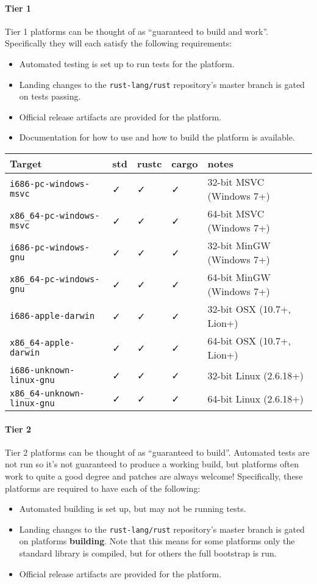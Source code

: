 \documentclass[a4paper,]{book}
\let\oldparagraph\paragraph
\renewcommand{\paragraph}[1]{\oldparagraph{#1}\mbox{}}
\begin{document}
\paragraph{Tier 1}\label{tier-1}

Tier 1 platforms can be thought of as ``guaranteed to build and work''.
Specifically they will each satisfy the following requirements:

\begin{itemize}
\itemsep1pt\parskip0pt
\item
  Automated testing is set up to run tests for the platform.
\item
  Landing changes to the \texttt{rust-lang/rust} repository's master
  branch is gated on tests passing.
\item
  Official release artifacts are provided for the platform.
\item
  Documentation for how to use and how to build the platform is
  available.
\end{itemize}

\begin{longtable}[c]{@{}lllll@{}}
\toprule
Target & std & rustc & cargo & notes\tabularnewline
\midrule
\endhead
\texttt{i686-pc-windows-msvc} & ✓ & ✓ & ✓ & 32-bit MSVC (Windows
7+)\tabularnewline
\texttt{x86\_64-pc-windows-msvc} & ✓ & ✓ & ✓ & 64-bit MSVC (Windows
7+)\tabularnewline
\texttt{i686-pc-windows-gnu} & ✓ & ✓ & ✓ & 32-bit MinGW (Windows
7+)\tabularnewline
\texttt{x86\_64-pc-windows-gnu} & ✓ & ✓ & ✓ & 64-bit MinGW (Windows
7+)\tabularnewline
\texttt{i686-apple-darwin} & ✓ & ✓ & ✓ & 32-bit OSX (10.7+,
Lion+)\tabularnewline
\texttt{x86\_64-apple-darwin} & ✓ & ✓ & ✓ & 64-bit OSX (10.7+,
Lion+)\tabularnewline
\texttt{i686-unknown-linux-gnu} & ✓ & ✓ & ✓ & 32-bit Linux
(2.6.18+)\tabularnewline
\texttt{x86\_64-unknown-linux-gnu} & ✓ & ✓ & ✓ & 64-bit Linux
(2.6.18+)\tabularnewline
\bottomrule
\end{longtable}

\paragraph{Tier 2}\label{tier-2}

Tier 2 platforms can be thought of as ``guaranteed to build''. Automated
tests are not run so it's not guaranteed to produce a working build, but
platforms often work to quite a good degree and patches are always
welcome! Specifically, these platforms are required to have each of the
following:

\begin{itemize}
\itemsep1pt\parskip0pt
\item
  Automated building is set up, but may not be running tests.
\item
  Landing changes to the \texttt{rust-lang/rust} repository's master
  branch is gated on platforms \textbf{building}. Note that this means
  for some platforms only the standard library is compiled, but for
  others the full bootstrap is run.
\item
  Official release artifacts are provided for the platform.
\end{itemize}
\end{document}
